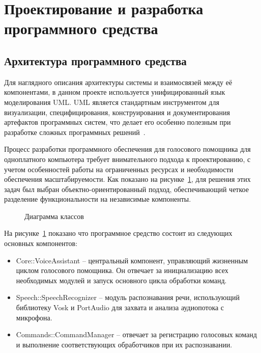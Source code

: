 \section{Проектирование и разработка программного средства}

\subsection{Архитектура программного средства}

Для наглядного описания архитектуры системы и взаимосвязей между её компонентами, в данном проекте используется унифицированный язык моделирования UML. UML является стандартным инструментом для визуализации, специфицирования, конструирования и документирования артефактов программных систем, что делает его особенно полезным при разработке сложных программных решений~\cite{UML}.

Процесс разработки программного обеспечения для голосового помощника для одноплатного компьютера требует внимательного подхода к проектированию, с учетом особенностей работы на ограниченных ресурсах и необходимости обеспечения масштабируемости. Как показано на рисунке~\ref{fig:class_diagram}, для решения этих задач был выбран объектно-ориентированный подход, обеспечивающий четкое разделение функциональности на независимые компоненты.

\begin{figure}[H]
	\centering
	\caption{Диаграмма классов}
	\label{fig:class_diagram}
\end{figure}
На рисунке~\ref{fig:class_diagram} показано что программное средство состоит из следующих основных компонентов:

\begin{itemize}
	\item {Core::VoiceAssistant} -- центральный компонент, управляющий жизненным циклом голосового помощника. Он отвечает за инициализацию всех необходимых модулей и запуск основного цикла обработки команд.
	
	\item {Speech::SpeechRecognizer} -- модуль распознавания речи, использующий библиотеку Vosk и PortAudio для захвата и анализа аудиопотока с микрофона.
	
	\item {Commands::CommandManager} -- отвечает за регистрацию голосовых команд и выполнение соответствующих обработчиков при их распознавании.
\end{itemize}

